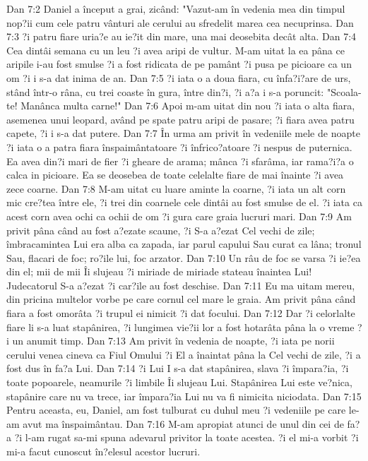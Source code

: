 Dan 7:2  Daniel a început a grai, zicând: "Vazut-am în vedenia mea din timpul nop?ii cum cele patru vânturi ale cerului au sfredelit marea cea necuprinsa.
Dan 7:3  ?i patru fiare uria?e au ie?it din mare, una mai deosebita decât alta.
Dan 7:4  Cea dintâi semana cu un leu ?i avea aripi de vultur. M-am uitat la ea pâna ce aripile i-au fost smulse ?i a fost ridicata de pe pamânt ?i pusa pe picioare ca un om ?i i s-a dat inima de an.
Dan 7:5  ?i iata o a doua fiara, cu înfa?i?are de urs, stând într-o râna, cu trei coaste în gura, între din?i, ?i a?a i s-a poruncit: "Scoala-te! Manânca multa carne!"
Dan 7:6  Apoi m-am uitat din nou ?i iata o alta fiara, asemenea unui leopard, având pe spate patru aripi de pasare; ?i fiara avea patru capete, ?i i s-a dat putere.
Dan 7:7  În urma am privit în vedeniile mele de noapte ?i iata o a patra fiara înspaimântatoare ?i înfrico?atoare ?i nespus de puternica. Ea avea din?i mari de fier ?i gheare de arama; mânca ?i sfarâma, iar rama?i?a o calca in picioare. Ea se deosebea de toate celelalte fiare de mai înainte ?i avea zece coarne.
Dan 7:8  M-am uitat cu luare aminte la coarne, ?i iata un alt corn mic cre?tea între ele, ?i trei din coarnele cele dintâi au fost smulse de el. ?i iata ca acest corn avea ochi ca ochii de om ?i gura care graia lucruri mari.
Dan 7:9  Am privit pâna când au fost a?ezate scaune, ?i S-a a?ezat Cel vechi de zile; îmbracamintea Lui era alba ca zapada, iar parul capului Sau curat ca lâna; tronul Sau, flacari de foc; ro?ile lui, foc arzator.
Dan 7:10  Un râu de foc se varsa ?i ie?ea din el; mii de mii Îi slujeau ?i miriade de miriade stateau înaintea Lui! Judecatorul S-a a?ezat ?i car?ile au fost deschise.
Dan 7:11  Eu ma uitam mereu, din pricina multelor vorbe pe care cornul cel mare le graia. Am privit pâna când fiara a fost omorâta ?i trupul ei nimicit ?i dat focului.
Dan 7:12  Dar ?i celorlalte fiare li s-a luat stapânirea, ?i lungimea vie?ii lor a fost hotarâta pâna la o vreme ?i un anumit timp.
Dan 7:13  Am privit în vedenia de noapte, ?i iata pe norii cerului venea cineva ca Fiul Omului ?i El a înaintat pâna la Cel vechi de zile, ?i a fost dus în fa?a Lui.
Dan 7:14  ?i Lui I s-a dat stapânirea, slava ?i împara?ia, ?i toate popoarele, neamurile ?i limbile Îi slujeau Lui. Stapânirea Lui este ve?nica, stapânire care nu va trece, iar împara?ia Lui nu va fi nimicita niciodata.
Dan 7:15  Pentru aceasta, eu, Daniel, am fost tulburat cu duhul meu ?i vedeniile pe care le-am avut ma înspaimântau.
Dan 7:16  M-am apropiat atunci de unul din cei de fa?a ?i l-am rugat sa-mi spuna adevarul privitor la toate acestea. ?i el mi-a vorbit ?i mi-a facut cunoscut în?elesul acestor lucruri.

